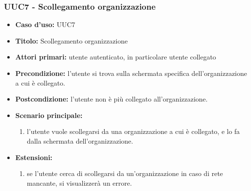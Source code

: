 \documentclass[casi-duso]{subfiles}
\begin{document}
\subsubsection{UUC7 - Scollegamento organizzazione}%
\label{subsub:UUC7utente}
\begin{itemize}
  \item \textbf{Caso d’uso:} UUC7
  \item \textbf{Titolo:} Scollegamento organizzazione
  \item \textbf{Attori primari:} utente autenticato, in particolare utente collegato
  \item \textbf{Precondizione:} l'utente si trova sulla schermata specifica dell'organizzazione a cui è collegato.
  \item \textbf{Postcondizione:} l'utente non è più collegato all'organizzazione.
  \item \textbf{Scenario principale:}
        \begin{enumerate}
          \item l'utente vuole scollegarsi da una organizzazione a cui è collegato, e lo fa dalla schermata dell'organizzazione.
        \end{enumerate}
  \item \textbf{Estensioni:}
        \begin{enumerate}
          \item se l'utente cerca di scollegarsi da un'organizzazione in caso di rete mancante, si visualizzerà un errore.
        \end{enumerate}
\end{itemize}

\end{document}
